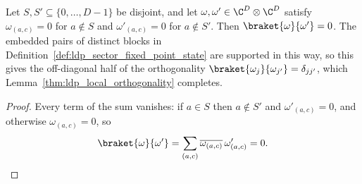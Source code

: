 \begin{lemma}
    \label{thm:ldp_pair_disjoint_orthogonal}
    \leanok
    Let $S,S'\subseteq\{0,\dots,D-1\}$ be disjoint, and let
    $\omega,\omega'\in\C^D\otimes\C^D$ satisfy $\omega_{(a,c)}=0$ for $a\notin S$
    and $\omega'_{(a,c)}=0$ for $a\notin S'$. Then
    $\braket{\omega}{\omega'}=0$. The embedded pairs of distinct blocks in
    Definition~\ref{def:ldp_sector_fixed_point_state} are supported in this way, so
    this gives the off-diagonal half of the orthogonality
    $\braket{\omega_j}{\omega_{j'}}=\delta_{jj'}$, which
    Lemma~\ref{thm:ldp_local_orthogonality} completes.
\end{lemma}

\begin{proof}
    \leanok
    Every term of the sum vanishes: if $a\in S$ then $a\notin S'$ and
    $\omega'_{(a,c)}=0$, and otherwise $\omega_{(a,c)}=0$, so
    \begin{align*}
        \braket{\omega}{\omega'}
        =\sum_{(a,c)}\overline{\omega_{(a,c)}}\,\omega'_{(a,c)}=0.
    \end{align*}
\end{proof}

